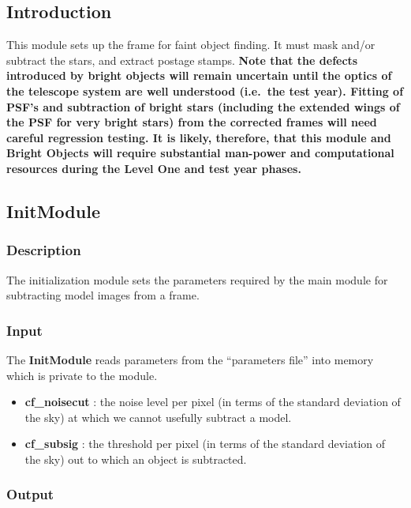  
\subsection{Introduction}
 
This module sets up the frame for faint object finding.  It must 
mask and/or subtract the stars, and extract postage stamps.
{\bf Note that the defects introduced by bright objects will
remain uncertain until the optics of the telescope system are well
understood (i.e.\ the test year). Fitting of PSF's and subtraction of
bright stars (including the extended wings of the PSF for very bright
stars) from the corrected frames will need
careful regression testing.
It is likely, therefore, that this module and {\bf Bright Objects}
will require substantial
man-power and computational resources during the
Level One and test year phases.}
 
\subsection {InitModule}
 
\subsubsection {Description}
 
The initialization module sets the parameters required by the main
module for subtracting model images from a frame.
 
\subsubsection {Input}
 
The {\bf InitModule} reads parameters from the ``parameters file''
into memory which is private to the module.  
 
\begin{itemize}
 
  \item {\bf cf\_noisecut} : the noise level per pixel (in terms of
the standard deviation of the sky) at which we cannot usefully
subtract a model.
 
  \item {\bf cf\_subsig} : the threshold per pixel (in terms of the
standard deviation of the sky) out to which an object is subtracted.
 
\end{itemize}
 
\subsubsection {Output}
 
